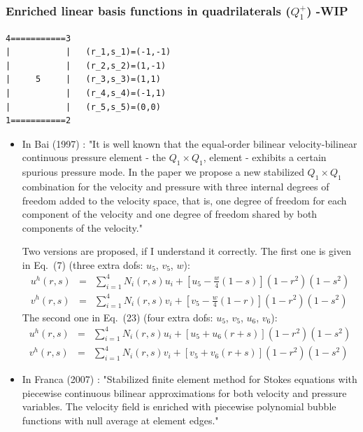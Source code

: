 \subsubsection{Enriched linear basis functions in quadrilaterals ($Q_1^+$) -WIP} \label{ss:quadmini}

\begin{verbatim}
4===========3
|           |   (r_1,s_1)=(-1,-1)
|           |   (r_2,s_2)=(1,-1)
|     5     |   (r_3,s_3)=(1,1)
|           |   (r_4,s_4)=(-1,1)
|           |   (r_5,s_5)=(0,0)
1===========2
\end{verbatim}

\begin{itemize}
\item 
In Bai (1997) \cite{bai97}: "It is well known that the equal-order bilinear velocity-bilinear 
continuous pressure element - the $Q_1\times Q_1$, element - exhibits a certain spurious pressure mode.
In the paper we propose a new stabilized $Q_1\times Q_1$ combination for the velocity and
pressure with three internal degrees of freedom added to the velocity space, that is, one degree of
freedom for each component of the velocity and one degree of freedom shared by both components of
the velocity."

Two versions are proposed, if I understand it correctly.
The first one is given in Eq.~(7) (three extra dofs: $u_5$, $v_5$, $w$):
\begin{eqnarray}
u^h(r,s) &=& \sum_{i=1}^4 N_i (r,s) u_i + \left[ u_5 - \frac{w}{4}(1-s) \right] (1-r^2)(1-s^2) \nonumber\\
v^h(r,s) &=& \sum_{i=1}^4 N_i (r,s) v_i + \left[ v_5 - \frac{w}{4}(1-r) \right] (1-r^2)(1-s^2) 
\end{eqnarray}
The second one in Eq.~(23) (four extra dofs: $u_5$, $v_5$, $u_6$, $v_6$):
\begin{eqnarray}
u^h(r,s) &=& \sum_{i=1}^4 N_i (r,s) u_i + \left[ u_5 +u_6(r+s) \right] (1-r^2)(1-s^2) \nonumber\\
v^h(r,s) &=& \sum_{i=1}^4 N_i (r,s) v_i + \left[ v_5 +v_6(r+s) \right] (1-r^2)(1-s^2) 
\end{eqnarray}

\item In Franca \etal (2007) \cite{fros07}: 
"Stabilized finite element method for Stokes equations with piecewise continuous 
bilinear approximations for both velocity and pressure variables. The velocity
field is enriched with piecewise polynomial bubble functions with null average at element
edges."


\end{itemize}
